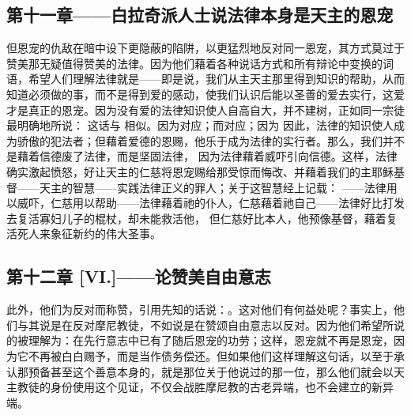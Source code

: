 \subsection{第十一章——白拉奇派人士说法律本身是天主的恩宠}

但恩宠的仇敌在暗中设下更隐蔽的陷阱，以更猛烈地反对同一恩宠，其方式莫过于赞美那无疑值得赞美的法律。因为他们藉着各种说话方式和所有辩论中变换的词语，希望人们理解法律就是——即是说，我们从主天主那里得到知识的帮助，从而知道必须做的事，而不是得到爱的感动，使我们认识后能以圣善的爱去实行，这爱才是真正的恩宠。因为没有爱的法律知识使人自高自大，并不建树，正如同一宗徒最明确地所说：  这话与  相似。因为对应；而对应；因为  因此，法律的知识使人成为骄傲的犯法者；但藉着爱德的恩赐，他乐于成为法律的实行者。那么，我们并不是藉着信德废了法律，而是坚固法律， 因为法律藉着威吓引向信德。这样，法律确实激起愤怒，好让天主的仁慈将恩宠赐给那受惊而悔改、并藉着我们的主耶稣基督——天主的智慧——实践法律正义的罪人；关于这智慧经上记载：  ——法律用以威吓，仁慈用以帮助——法律藉着祂的仆人，仁慈藉着祂自己——法律好比打发去复活寡妇儿子的棍杖，却未能救活他，  但仁慈好比本人，他预像基督，藉着复活死人来象征新约的伟大圣事。\par


\subsection{第十二章 [VI.]——论赞美自由意志}

此外，他们为反对而称赞，引用先知的话说：。这对他们有何益处呢？事实上，他们与其说是在反对摩尼教徒，不如说是在赞颂自由意志以反对。因为他们希望所说的被理解为：在先行意志中已有了随后恩宠的功劳；这样，恩宠就不再是恩宠，因为它不再被白白赐予，而是当作债务偿还。但如果他们这样理解这句话，以至于承认那预备甚至这个善意本身的，就是那位关于他说过的那一位，那么他们就会以天主教徒的身份使用这个见证，不仅会战胜摩尼教的古老异端，也不会建立的新异端。\par

